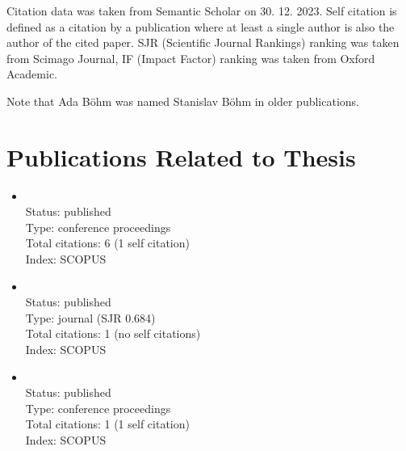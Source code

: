 Citation data was taken from Semantic Scholar on 30. 12. 2023. Self citation
is defined as a citation by a publication where at least a single author is also the author of the
cited paper. SJR (Scientific Journal Rankings) ranking was taken from Scimago
Journal, IF (Impact Factor) ranking was taken from Oxford
Academic.

Note that Ada Böhm was named Stanislav Böhm in older publications.

\section*{Publications Related to Thesis}
\begin{itemize}
	\item{}\vspace{2mm}\\Status: published\\Type: conference
	proceedings\\Total citations: 6 (1 self citation)\\Index: SCOPUS
	\item{}\vspace{2mm}\\Status: published\\Type: journal (SJR
	0.684)\\Total citations: 1 (no self citations)\\Index: SCOPUS
	\item{}\vspace{2mm}\\Status: published\\Type: conference
	proceedings\\Total citations: 1 (1 self citation)\\Index: SCOPUS
\end{itemize}

\newpage

